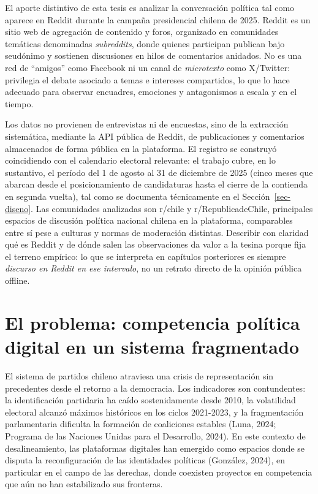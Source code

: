 \documentclass[
  letterpaper,
  numbers=noendperiod,
  fontsize=11pt,
  DIV=12,
  titlepage=false]{scrreprt}
\begin{document}
El aporte distintivo de esta tesis es analizar la conversación política
tal como aparece en Reddit durante la campaña presidencial chilena de
2025. Reddit es un sitio web de agregación de contenido y foros,
organizado en comunidades temáticas denominadas \emph{subreddits}, donde
quienes participan publican bajo seudónimo y sostienen discusiones en
hilos de comentarios anidados. No es una red de ``amigos'' como Facebook
ni un canal de \emph{microtexto} como X/Twitter: privilegia el debate
asociado a temas e intereses compartidos, lo que lo hace adecuado para
observar encuadres, emociones y antagonismos a escala y en el tiempo.

Los datos no provienen de entrevistas ni de encuestas, sino de la
extracción sistemática, mediante la API pública de Reddit, de
publicaciones y comentarios almacenados de forma pública en la
plataforma. El registro se construyó coincidiendo con el calendario
electoral relevante: el trabajo cubre, en lo sustantivo, el período del
1 de agosto al 31 de diciembre de 2025 (cinco meses que abarcan desde el
posicionamiento de candidaturas hasta el cierre de la contienda en
segunda vuelta), tal como se documenta técnicamente en el
Sección~\ref{sec-diseno}. Las comunidades analizadas son r/chile y
r/RepublicadeChile, principales espacios de discusión política nacional
chilena en la plataforma, comparables entre sí pese a culturas y normas
de moderación distintas. Describir con claridad qué es Reddit y de dónde
salen las observaciones da valor a la tesina porque fija el terreno
empírico: lo que se interpreta en capítulos posteriores es siempre
\emph{discurso en Reddit en ese intervalo}, no un retrato directo de la
opinión pública offline.

\section{El problema: competencia política digital en un sistema
fragmentado}\label{el-problema-competencia-poluxedtica-digital-en-un-sistema-fragmentado}

El sistema de partidos chileno atraviesa una crisis de representación
sin precedentes desde el retorno a la democracia. Los indicadores son
contundentes: la identificación partidaria ha caído sostenidamente desde
2010, la volatilidad electoral alcanzó máximos históricos en los ciclos
2021-2023, y la fragmentación parlamentaria dificulta la formación de
coaliciones estables (Luna, 2024; Programa de las Naciones Unidas para
el Desarrollo, 2024). En este contexto de desalineamiento, las
plataformas digitales han emergido como espacios donde se disputa la
reconfiguración de las identidades políticas (González, 2024), en
particular en el campo de las derechas, donde coexisten proyectos en
competencia que aún no han estabilizado sus fronteras.
\end{document}

